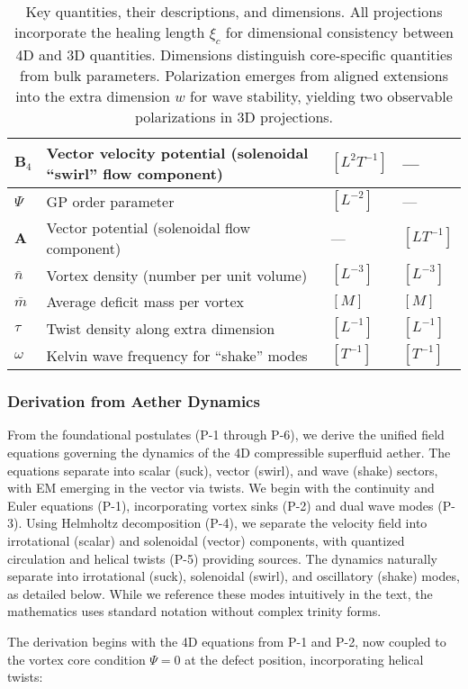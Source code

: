 \begin{table}[H]
\begin{tabularx}{\textwidth}{|l|Y|l|l|}
\hline
$\mathbf{B}_4$ & Vector velocity potential (solenoidal ``swirl'' flow component) & $[L^2 T^{-1}]$ & --- \\
\hline
$\Psi$ & GP order parameter & $[L^{-2}]$ & --- \\
\hline
$\mathbf{A}$ & Vector potential (solenoidal flow component) & --- & $[L T^{-1}]$ \\
\hline
$\bar{n}$ & Vortex density (number per unit volume) & $[L^{-3}]$ & $[L^{-3}]$ \\
\hline
$\bar{m}$ & Average deficit mass per vortex & $[M]$ & $[M]$ \\
\hline
$\tau$ & Twist density along extra dimension & $[L^{-1}]$ & $[L^{-1}]$ \\
\hline
$\omega$ & Kelvin wave frequency for ``shake'' modes & $[T^{-1}]$ & $[T^{-1}]$ \\
\hline
\end{tabularx}
\caption{Key quantities, their descriptions, and dimensions. All projections incorporate the healing length $\xi_c$ for dimensional consistency between 4D and 3D quantities. Dimensions distinguish core-specific quantities from bulk parameters. Polarization emerges from aligned extensions into the extra dimension $w$ for wave stability, yielding two observable polarizations in 3D projections.}
\label{tab:notation}
\end{table}

\subsubsection{Derivation from Aether Dynamics}

From the foundational postulates (P-1 through P-6), we derive the unified field equations governing the dynamics of the 4D compressible superfluid aether. The equations separate into scalar (suck), vector (swirl), and wave (shake) sectors, with EM emerging in the vector via twists. We begin with the continuity and Euler equations (P-1), incorporating vortex sinks (P-2) and dual wave modes (P-3). Using Helmholtz decomposition (P-4), we separate the velocity field into irrotational (scalar) and solenoidal (vector) components, with quantized circulation and helical twists (P-5) providing sources. The dynamics naturally separate into irrotational (suck), solenoidal (swirl), and oscillatory (shake) modes, as detailed below. While we reference these modes intuitively in the text, the mathematics uses standard notation without complex trinity forms.

The derivation begins with the 4D equations from P-1 and P-2, now coupled to the vortex core condition $\Psi=0$ at the defect position, incorporating helical twists:

